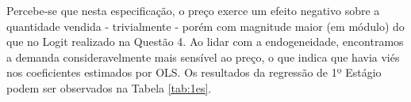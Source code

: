 \documentclass{article}
\begin{document}
\begin{table}[H]
\par\endgroup
    \caption{Regressão IV}
    \label{tab:iv}
\end{table}


Percebe-se que nesta especificação, o preço exerce um efeito negativo sobre a quantidade vendida - trivialmente - porém com magnitude maior (em módulo) do que no Logit realizado na Questão 4. Ao lidar com a endogeneidade, encontramos a demanda consideravelmente mais sensível ao preço, o que indica que havia viés nos coeficientes estimados por OLS. Os resultados da regressão de 1º Estágio podem ser observados na Tabela \ref{tab:1es}.
\end{document}
